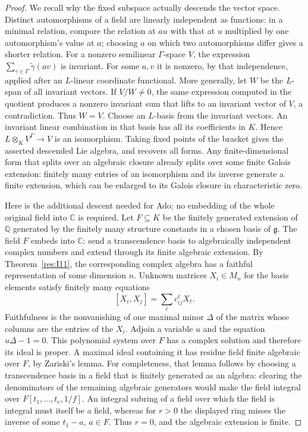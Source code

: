 \begin{proof}
We recall why the fixed subspace actually descends the vector space.
Distinct automorphisms of a field are linearly independent as functions:
in a minimal relation, compare the relation at \(au\) with that at
\(u\) multiplied by one automorphism's value at \(a\); choosing \(a\)
on which two automorphisms differ gives a shorter relation.
For a nonzero semilinear \(\Gamma\)-space \(V\), the expression
\(\sum_{\gamma\in\Gamma}\widetilde\gamma(a v)\) is invariant.
For some \(a,v\) it is nonzero, by that independence, applied
after an \(L\)-linear coordinate functional.
More generally, let \(W\) be the \(L\)-span of all invariant
vectors. If \(V/W\ne0\), the same expression computed in the
quotient produces a nonzero invariant sum that lifts to an
invariant vector of \(V\), a contradiction. Thus \(W=V\).
Choose an \(L\)-basis from the invariant vectors. An invariant
linear combination in that basis has all its coefficients in
\(K\). Hence
\(L\otimes_K V^\Gamma\to V\) is an isomorphism.
Taking fixed points of the bracket gives the asserted descended
Lie algebra, and recovers all forms. Any finite-dimensional form
that splits over an algebraic closure already splits over some
finite Galois extension: finitely many entries of an isomorphism
and its inverse generate a finite extension, which can be enlarged
to its Galois closure in characteristic zero.

Here is the additional descent needed for Ado; no embedding of the
whole original field into \(\mathbb C\) is required.
Let \(F\subseteq K\) be the finitely generated extension of
\(\mathbb Q\) generated by the finitely many structure constants
in a chosen basis of \(\mathfrak g\). The field \(F\) embeds into
\(\mathbb C\): send a transcendence basis to algebraically
independent complex numbers and extend through its finite
algebraic extension. By Theorem~\ref{res:I11}, the corresponding
complex algebra has a faithful representation of some dimension
\(n\). Unknown matrices \(X_i\in M_n\) for the basis elements
satisfy finitely many equations
\[
 [X_i,X_j]=\sum_\ell c_{ij}^{\ell}X_\ell.
\]
Faithfulness is the nonvanishing of one maximal minor \(\Delta\)
of the matrix whose columns are the entries of the \(X_i\).
Adjoin a variable \(u\) and the equation \(u\Delta-1=0\).
This polynomial system over \(F\) has a complex solution and
therefore its ideal is proper. A maximal ideal containing it
has residue field finite algebraic over \(F\), by Zariski's lemma.
For completeness, that lemma follows by choosing a transcendence
basis in a field that is finitely generated as an algebra:
clearing the denominators of the remaining algebraic generators
would make the field integral over
\(F[t_1,\ldots,t_r,1/f]\). An integral subring of a field over
which the field is integral must itself be a field, whereas for
\(r>0\) the displayed ring misses the inverse of some \(t_1-a\),
\(a\in F\). Thus \(r=0\), and the algebraic extension is finite.


\end{proof}
